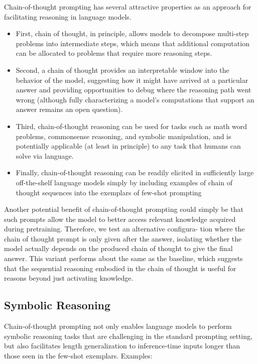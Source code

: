 \documentclass[10pt,a4paper]{article}
\begin{document}
\begin{multicols}{2}
    Chain-of-thought prompting has several attractive properties as an approach for facilitating reasoning
in language models.

    \begin{itemize}
\item First, chain of thought, in principle, allows models to decompose multi-step problems into
intermediate steps, which means that additional computation can be allocated to problems
that require more reasoning steps.
\item Second, a chain of thought provides an interpretable window into the behavior of the model,
suggesting how it might have arrived at a particular answer and providing opportunities
to debug where the reasoning path went wrong (although fully characterizing a model’s
computations that support an answer remains an open question).
\item Third, chain-of-thought reasoning can be used for tasks such as math word problems,
commonsense reasoning, and symbolic manipulation, and is potentially applicable (at least
in principle) to any task that humans can solve via language.
\item Finally, chain-of-thought reasoning can be readily elicited in sufficiently large off-the-shelf
language models simply by including examples of chain of thought sequences into the
exemplars of few-shot prompting
    \end{itemize}

    Another potential benefit of
chain-of-thought prompting could simply be that such prompts
allow the model to better access relevant knowledge acquired
during pretraining. Therefore, we test an alternative configura-
tion where the chain of thought prompt is only given after the
answer, isolating whether the model actually depends on the
produced chain of thought to give the final answer. This variant
performs about the same as the baseline, which suggests that
the sequential reasoning embodied in the chain of thought is
useful for reasons beyond just activating knowledge.

\subsection*{Symbolic Reasoning}

Chain-of-thought prompting not only enables language models to
perform symbolic reasoning tasks that are challenging in
the standard prompting setting, but also facilitates length
generalization to inference-time inputs longer than those
seen in the few-shot exemplars. Examples:


\end{multicols}
\end{document}
